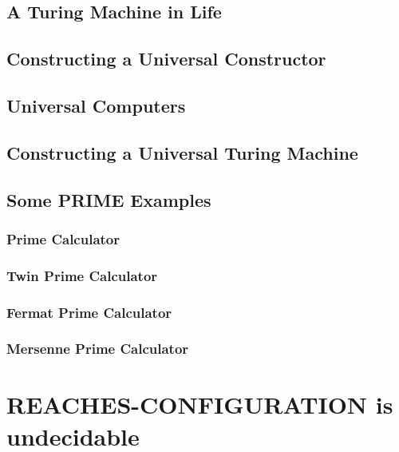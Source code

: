 \documentclass{article}
\theoremstyle{definition}
\theoremstyle{plain}
\theoremstyle{plain}
\begin{document}
\subsection{A Turing Machine in Life}



\subsection{Constructing a Universal Constructor}


\subsection{Universal Computers}


\subsection{Constructing a Universal Turing Machine}


\subsection{Some PRIME Examples}

\subsubsection{Prime Calculator}

\subsubsection{Twin Prime Calculator}

\subsubsection{Fermat Prime Calculator}

\subsubsection{Mersenne Prime Calculator}



\section{REACHES-CONFIGURATION is undecidable}

\printbibliography
\end{document}
